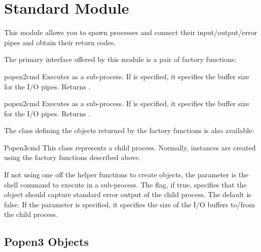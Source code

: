 
\section{Standard Module }
\label{module-popen2}

This module allows you to spawn processes and connect their 
input/output/error pipes and obtain their return codes.

The primary interface offered by this module is a pair of factory
functions:

\begin{funcdesc}{popen2}{cmd}
Executes  as a sub-process.  If  is specified, 
it specifies the buffer size for the I/O pipes.  Returns
.
\end{funcdesc}

\begin{funcdesc}{popen2}{cmd}
Executes  as a sub-process.  If  is specified, 
it specifies the buffer size for the I/O pipes.  Returns
.
\end{funcdesc}

The class defining the objects returned by the factory functions is
also available:

\begin{classdesc}{Popen3}{cmd}
This class represents a child process.  Normally, 
instances are created using the factory functions described above.

If not using one off the helper functions to create 
objects, the parameter  is the shell command to execute in a
sub-process.  The  flag, if true, specifies that
the object should capture standard error output of the child process.
The default is false.  If the  parameter is specified, it
specifies the size of the I/O buffers to/from the child process.
\end{classdesc}


\subsection{Popen3 Objects}
\label{popen3-objects}

